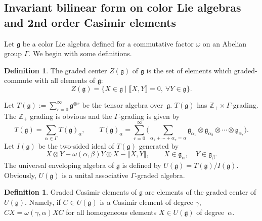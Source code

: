 \documentclass[10pt,a4paper]{amsart}
\numberwithin{equation}{section}
\theoremstyle{definition}
\newtheorem{Definition}[Theorem]{Definition}
\def\g{\mathfrak{g}}
\begin{document}
\subsection[Invariant bilinear form on color Lie algebras and 2nd order Casimir elements]{Invariant bilinear form on color Lie algebras\\ and 2nd order Casimir elements}

Let $\g$ be a color Lie algebra defined for a commutative factor $\omega$ on an Abelian group $\Gamma$.
We begin with some definitions.

\begin{Definition}\label{DEF:gcenter}
	The graded center $Z(\g)$ of $\g$ is the set of elements which graded-commute with all elements of $\g$:
	\begin{equation*}
		Z(\g) = \{ X \in \g \mid \llbracket X, Y \rrbracket = 0, \ \forall Y \in \g \}.
	\end{equation*}
\end{Definition}

Let $T(\g) := \sum_{r=0}^{\infty	} \g^{\otimes r} $ be the tensor algebra over~$\g$.
$T(\g)$ has $ \mathbb{Z}_+ \times \Gamma$-grading. The $\mathbb{Z}_+$ grading is obvious and the $\Gamma$-grading is given by
\begin{equation*}
	T(\g) = \sum_{\alpha\in \Gamma} T(\g)_{\alpha},
	\qquad
	T(\g)_{\alpha} = \sum_{r=0}^{\infty}\biggl( \sum_{\alpha_1+ \cdots + \alpha_r = \alpha} \g_{\alpha_1} \otimes \g_{\alpha_2} \otimes \cdots \otimes \g_{\alpha_r} \biggr).
\end{equation*}
Let $I(\g)$ be the two-sided ideal of $T(\g)$ generated by
\begin{equation*}
	X \otimes Y - \omega(\alpha,\beta) Y \otimes X - \llbracket X, Y \rrbracket, \qquad X \in \g_{\alpha},\quad Y \in \g_{\beta}.
\end{equation*}
The universal enveloping algebra of $\g$ is defined by $U(\g) = T(\g)/I(\g).$
Obviously, $U(\g)$ is a unital associative $\Gamma$-graded algebra.

\begin{Definition}
	Graded Casimir elements of $\g$ are elements of the graded center of $U(\g)$.
	Namely, if $C \in U(\g)$ is a Casimir element of degree $\gamma$, $ C X = \omega(\gamma, \alpha) XC $ for all homogeneous elements $ X \in U(\g) $ of degree~$\alpha$.
\end{Definition}
\end{document}
